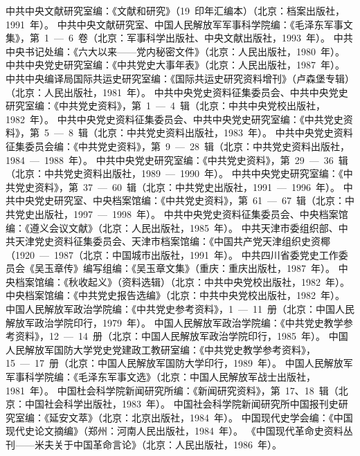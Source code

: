 \begin{thebibliography}{999}
\bibitem{}中共中央文献研究室编：《文献和研究》（19~印年汇编本）（北京：档案出版社，1991~年）。
\bibitem{}中共中央文献研究室、中国人民解放军军事科学院编：《毛泽东军事文集》，第~1~—~6~卷（北京：军事科学出版社、中央文献出版社，1993~年）。
\bibitem{}中共中央书记处编：《六大以来——党内秘密文件》（北京：人民出版社，1980~年）。
\bibitem{}中共中央党史研究室编：《中共党史大事年表》（北京：人民出版社，1987~年）。
\bibitem{}中共中央编译局国际共运史研究室编：《国际共运史研究资料增刊》（卢森堡专辑）（北京：人民出版社，1981~年）。
\bibitem{}中共中央党史资料征集委员会、中共中央党史研究室编：《中共党史资料》，第~1~—~4~辑（北京：中共中央党校出版社，1982~年）。
\bibitem{}中共中央党史资料征集委员会、中共中央党史研究室编：《中共党史资料》，第~5~—~8~辑（北京：中共党史资料出版社，1983~年）。
\bibitem{}中共中央党史资料征集委员会编：《中共党史资料》，第~9~—~28~辑（北京：中共党史资料出版社，1984~—~1988~年）。
\bibitem{}中共中央党史研究室编：《中共党史资料》，第~29~—~36~辑（北京：中共党史资料出版社，1989~—~1990~年）。
\bibitem{}中共中央党史研究室编：《中共党史资料》，第~37~—~60~辑（北京：中共党史出版社，1991~—~1996~年）。
\bibitem{}中共中央党史研究室、中央档案馆编：《中共党史资料》，第~61~—~67~辑（北京：中共党史出版社，1997~—~1998~年）。
\bibitem{}中共中央党史资料征集委员会、中央档案馆编：《遵义会议文献》（北京：人民出版社，1985~年）。
\bibitem{}中共天津市委组织部、中共天津党史资料征集委员会、天津市档案馆编：《中国共产党天津组织史资椰（1920~—~1987（北京：中国城市出版社，1991~年）。
\bibitem{}中共四川省委党史工作委员会《吴玉章传》编写组编：《吴玉章文集》（重庆：重庆出版杜，1987~年）。
\bibitem{}中央档案馆编：《秋收起义》（资料选辑）（北京：中共中央党校出版社，1982~年）。
\bibitem{}中央档案馆编：《中共党史报告选编》（北京：中共中央党校出版社，1982~年）。
\bibitem{}中国人民解放军政治学院编：《中共党史参考资料》，1~—~11~册（北京：中国人民解放军政治学院印行，1979~年）。
\bibitem{}中国人民解放军政治学院编：《中共党史教学参考资料》，12~—~14~册（北京：中国人民解放军政治学院印行，1985~年）。
\bibitem{}中国人民解放军国防大学党史党建政工教研室编：《中共党史教学参考资料》，15~—~17~册（北京：中国人民解放军国防大学印行，1989~年）。
\bibitem{}中国人民解放军军事科学院编：《毛泽东军事文选》（北京：中国人民解放军战士出版社，1981~年）。
\bibitem{}中国杜会科学院新闻研究所编：《新闻研究资料》，第~17、18~辑（北京：中国社会科学出版社，1983~年）。
\bibitem{}中国社会科学院新闻研究所中国报刊史研究室编：《延安文萃》（北京：北京出版社，1984~年）。
\bibitem{}中国现代史学会编：《中国现代史论文摘编》（郑州：河南人民出版社，1984~年）。
\bibitem{}《中国现代革命史资料丛刊——米夫关于中国革命言论》（北京：人民出版社，1986~年）。

\end{thebibliography}
